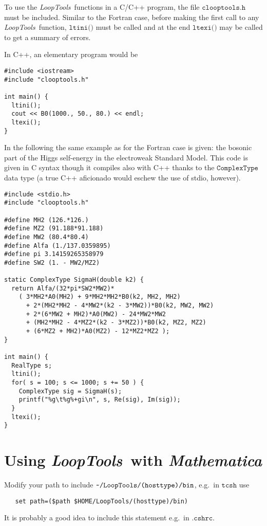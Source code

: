 \documentclass[twoside,12pt]{report}
\def\LT{\textit{LoopTools}}
\def\mma{{\it Mathematica}}
\def\eg{e.g.\ }
\def\home{\symbol{126}}
\def\Code#1{\ensuremath{\texttt{#1}}}
\begin{document}
To use the \LT\ functions in a C/C++ program, the file 
\Code{clooptools.h} must be included.  Similar to the Fortran case, 
before making the first call to any \LT\ function, \Code{ltini()} must 
be called and at the end \Code{ltexi()} may be called to get a summary 
of errors.

In C++, an elementary program would be
{\samepage
\begin{verbatim}
#include <iostream>
#include "clooptools.h"

int main() {
  ltini();
  cout << B0(1000., 50., 80.) << endl;
  ltexi();
}
\end{verbatim}}

In the following the same example as for the Fortran case is given: the 
bosonic part of the Higgs self-energy in the electroweak Standard Model. 
This code is given in C syntax though it compiles also with C++ thanks 
to the \Code{ComplexType} data type (a true C++ aficionado would eschew 
the use of stdio, however).
\begin{verbatim}
#include <stdio.h>
#include "clooptools.h"

#define MH2 (126.*126.)
#define MZ2 (91.188*91.188)
#define MW2 (80.4*80.4)
#define Alfa (1./137.0359895)
#define pi 3.14159265358979
#define SW2 (1. - MW2/MZ2)

static ComplexType SigmaH(double k2) {
  return Alfa/(32*pi*SW2*MW2)*
    ( 3*MH2*A0(MH2) + 9*MH2*MH2*B0(k2, MH2, MH2)
      + 2*(MH2*MH2 - 4*MW2*(k2 - 3*MW2))*B0(k2, MW2, MW2)
      + 2*(6*MW2 + MH2)*A0(MW2) - 24*MW2*MW2
      + (MH2*MH2 - 4*MZ2*(k2 - 3*MZ2))*B0(k2, MZ2, MZ2)
      + (6*MZ2 + MH2)*A0(MZ2) - 12*MZ2*MZ2 );
}

int main() {
  RealType s;
  ltini();
  for( s = 100; s <= 1000; s += 50 ) {
    ComplexType sig = SigmaH(s);
    printf("%g\t%g%+gi\n", s, Re(sig), Im(sig));
  }
  ltexi();
}
\end{verbatim}


\section{Using \LT\ with \mma}

\index{Mathematica@\mma}%
%
Modify your path to include \Code{\home/LoopTools/(hosttype)/bin}, \eg in
\Code{tcsh} use
\begin{verbatim}
   set path=($path $HOME/LoopTools/(hosttype)/bin)
\end{verbatim}
It is probably a good idea to include this statement \eg in \Code{.cshrc}.
\end{document}
